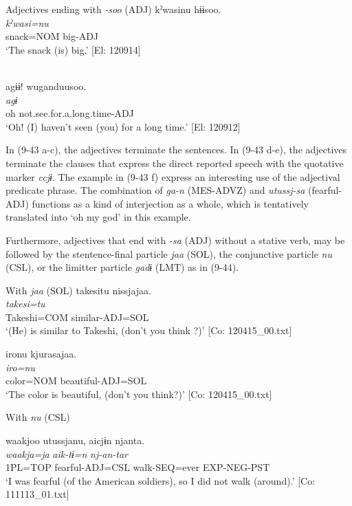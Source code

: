 \exi{} Adjectives ending with \textit{{}-soo} (ADJ)
\ex %
\glll   kˀwasinu  hɨɨsoo.\\
      \textit{kˀwasi=nu}  \textit{}\\
      snack=NOM  big-ADJ\\
      \glt       ‘The snack (is) big.’ [El: 120914]

\ex\relax [= (4-50 b)]\\
    \glll  agɨɨ!  wuganduusoo.\\
      \textit{agɨ}  \textit{}\\
      oh  not.see.for.a.long.time-ADJ\\
      \glt       ‘Oh! (I) haven’t seen (you) for a long time.’ [El: 120912]
    \z
\z

In (9-43 a-c), the adjectives terminate the sentences. In (9-43 d-e), the adjectives terminate the clauses that express the direct reported speech with the quotative marker \textit{ccjɨ}. The example in (9-43 f) express an interesting use of the adjectival predicate phrase. The combination of \textit{ga-n} (MES-ADVZ) and \textit{utussj-sa} (fearful-ADJ) functions as a kind of interjection as a whole, which is tentatively translated into ‘oh my god’ in this example.

  Furthermore, adjectives that end with \textit{-sa} (ADJ) without a stative verb, may be followed by the stentence-final particle \textit{jaa} (SOL), the conjunctive particle \textit{nu} (CSL), or the limitter particle \textit{gadɨ} (LMT) as in (9-44).

\ea   With \textit{jaa} (SOL) \label{ex:9.44}
\ea %
 \glll  takesitu  nissjajaa.\\
      \textit{takesi=tu}  \textit{}\\
      Takeshi=COM  similar-ADJ=SOL\\
      \glt       ‘(He) is similar to Takeshi, (don’t you think ?)’ [Co: 120415\_00.txt]

\ex \label{ex:9.44b} %
    \glll  {\textbar}iro{\textbar}nu  kjurasajaa.\\
      \textit{iro=nu}  \textit{}\\
      color=NOM  beautiful-ADJ=SOL\\
      \glt       ‘The color is beautiful, (don’t you think?)’ [Co: 120415\_00.txt]

\exi{}  With \textit{nu} (CSL)

\ex \label{ex:9.44c} %
    \glll  waakjoo  utussjanu,  aicjɨn  njanta.\\
      \textit{waakja=ja}  \textit{}  \textit{aik-tɨ=n}  \textit{nj-an-tar}\\
      1PL=TOP  fearful-ADJ=CSL  walk-SEQ=ever  EXP-NEG-PST\\
      \glt       ‘I was fearful (of the American soldiers), so I did not walk (around).’ [Co: 111113\_01.txt]

